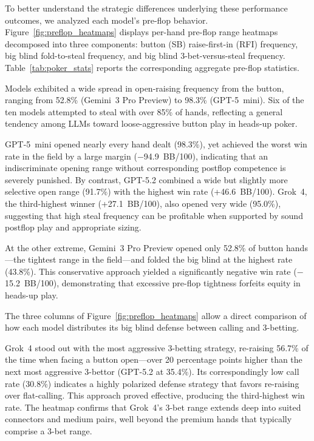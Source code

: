\documentclass{article}
\begin{document}
To better understand the strategic differences underlying these performance outcomes, we analyzed each model's pre-flop behavior. Figure~\ref{fig:preflop_heatmaps} displays per-hand pre-flop range heatmaps decomposed into three components: button (SB) raise-first-in (RFI) frequency, big blind fold-to-steal frequency, and big blind 3-bet-versus-steal frequency. Table~\ref{tab:poker_stats} reports the corresponding aggregate pre-flop statistics.


Models exhibited a wide spread in open-raising frequency from the button, ranging from 52.8\% (Gemini~3 Pro Preview) to 98.3\% (GPT-5~mini). Six of the ten models attempted to steal with over 85\% of hands, reflecting a general tendency among LLMs toward loose-aggressive button play in heads-up poker.

GPT-5~mini opened nearly every hand dealt (98.3\%), yet achieved the worst win rate in the field by a large margin ($-$94.9~BB/100), indicating that an indiscriminate opening range without corresponding postflop competence is severely punished. By contrast, GPT-5.2 combined a wide but slightly more selective open range (91.7\%) with the highest win rate (+46.6~BB/100). Grok~4, the third-highest winner (+27.1~BB/100), also opened very wide (95.0\%), suggesting that high steal frequency can be profitable when supported by sound postflop play and appropriate sizing.

At the other extreme, Gemini~3 Pro Preview opened only 52.8\% of button hands---the tightest range in the field---and folded the big blind at the highest rate (43.8\%). This conservative approach yielded a significantly negative win rate ($-$15.2~BB/100), demonstrating that excessive pre-flop tightness forfeits equity in heads-up play.


The three columns of Figure~\ref{fig:preflop_heatmaps} allow a direct comparison of how each model distributes its big blind defense between calling and 3-betting.

Grok~4 stood out with the most aggressive 3-betting strategy, re-raising 56.7\% of the time when facing a button open---over 20 percentage points higher than the next most aggressive 3-bettor (GPT-5.2 at 35.4\%). Its correspondingly low call rate (30.8\%) indicates a highly polarized defense strategy that favors re-raising over flat-calling. This approach proved effective, producing the third-highest win rate. The heatmap confirms that Grok~4's 3-bet range extends deep into suited connectors and medium pairs, well beyond the premium hands that typically comprise a 3-bet range.
\end{document}
